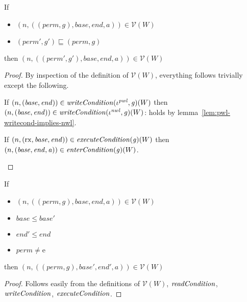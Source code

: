 \documentclass[a4paper]{article}
\newcommand{\var}[1]{\mathit{#1}}
\newcommand{\gl}{\var{g}}
\newcommand{\addr}{\var{a}}
\newcommand{\start}{\var{base}}
\newcommand{\addrend}{\var{end}}
\newcommand{\perm}{\var{perm}}
\newcommand{\nwl}{\var{nwl}}
\newcommand{\pwl}{\var{pwl}}
\newcommand{\plainfun}[2]{
  \ifthenelse{\equal{#2}{}}
  {\mathit{#1}}
  {\mathit{#1}(#2)}
}
\newcommand{\readCond}[1]{\plainfun{readCondition}{#1}}
\newcommand{\writeCond}[1]{\plainfun{writeCondition}{#1}}
\newcommand{\execCond}[1]{\plainfun{executeCondition}{#1}}
\newcommand{\entryCond}[1]{\plainfun{enterCondition}{#1}}
\newcommand{\asmType}{\plaindom{AsmType}}
\newcommand{\plaindom}[1]{\mathrm{#1}}
\newcommand{\intr}[2]{\mathcal{#1}}
\newcommand{\valueintr}[1]{\intr{V}{#1}}
\newcommand{\stdvr}{\valueintr{\asmType}}
\newcommand{\npair}[2][n]{\left(#1,#2 \right)}
\newcommand{\plainperm}[1]{\mathrm{#1}}
\newcommand{\exec}{\plainperm{rx}}
\newcommand{\entry}{\plainperm{e}}
\begin{document}
 \begin{lemma}
   \label{lem:conds-restrict-suffice}
   If
   \begin{itemize}
   \item $\npair{((\perm,\gl),\start,\addrend,\addr)}\in\stdvr(W)$
   \item $(\perm',\gl')\sqsubseteq (\perm,\gl)$
   \end{itemize}
 
   then  $\npair{((\perm',\gl'),\start,\addrend,\addr)}\in \stdvr(W)$
 \end{lemma}
 \begin{proof}
   By inspection of the definition of $\stdvr(W)$, everything follows trivially
   except the following.

   \begin{enumproof}
   \item If $\npair{(\start,\addrend)} \in \writeCond{}(\iota^\pwl,\gl)(W)$ then
     $\npair{(\start,\addrend)} \in \writeCond{}(\iota^\nwl,\gl)(W)$: holds
     by lemma~\ref{lem:pwl-writecond-implies-nwl}.
   \item If $\npair{(\exec,\start,\addrend)} \in \execCond{}(\gl)(W)$ then
     $\npair{(\start,\addrend,\addr)} \in \entryCond{}(\gl)(W)$.
   \end{enumproof}
 \end{proof}
 
 \begin{lemma}
   \label{lem:conds-subseg-suffice}
   If
   \begin{itemize}
   \item $\npair{((\perm,\gl),\start,\addrend,\addr)} \in \stdvr(W)$
   \item $\start \leq \start'$
   \item $\addrend' \leq \addrend$
   \item $\perm \neq \entry$
   \end{itemize}
 
   then $\npair{((\perm,\gl),\start',\addrend',\addr)} \in \stdvr(W)$
 \end{lemma}
 \begin{proof}
   Follows easily from the definitions of $\stdvr(W)$, $\readCond{}$,
   $\writeCond{}$, $\execCond{}$.
 \end{proof}
 
\end{document}
